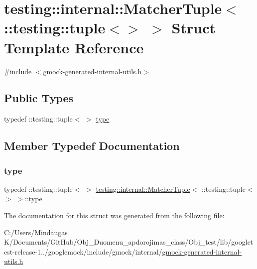 \hypertarget{structtesting_1_1internal_1_1_matcher_tuple_3_01_1_1testing_1_1tuple_3_4_01_4}{}\section{testing\+::internal\+::Matcher\+Tuple$<$ \+::testing\+::tuple$<$$>$ $>$ Struct Template Reference}
\label{structtesting_1_1internal_1_1_matcher_tuple_3_01_1_1testing_1_1tuple_3_4_01_4}


{\ttfamily \#include $<$gmock-\/generated-\/internal-\/utils.\+h$>$}

\subsection*{Public Types}
\begin{DoxyCompactItemize}
\item 
typedef \+::testing\+::tuple$<$ $>$ \mbox{\hyperlink{structtesting_1_1internal_1_1_matcher_tuple_3_01_1_1testing_1_1tuple_3_4_01_4_a8d4493b2b299322e6c885dee5473ebd7}{type}}
\end{DoxyCompactItemize}


\subsection{Member Typedef Documentation}
\mbox{\label{structtesting_1_1internal_1_1_matcher_tuple_3_01_1_1testing_1_1tuple_3_4_01_4_a8d4493b2b299322e6c885dee5473ebd7}} 
\subsubsection{\texorpdfstring{type}{type}}
{\footnotesize\ttfamily typedef \+::testing\+::tuple$<$ $>$ \mbox{\hyperlink{structtesting_1_1internal_1_1_matcher_tuple}{testing\+::internal\+::\+Matcher\+Tuple}}$<$ \+::testing\+::tuple$<$$>$ $>$\+::\mbox{\hyperlink{structtesting_1_1internal_1_1_matcher_tuple_3_01_1_1testing_1_1tuple_3_4_01_4_a8d4493b2b299322e6c885dee5473ebd7}{type}}}



The documentation for this struct was generated from the following file\+:\begin{DoxyCompactItemize}
\item 
C\+:/\+Users/\+Mindaugas K/\+Documents/\+Git\+Hub/\+Obj\+\_\+\+Duomenu\+\_\+apdorojimas\+\_\+class/\+Obj\+\_\+test/lib/googletest-\/release-\/1../googlemock/include/gmock/internal/\mbox{\hyperlink{gmock-generated-internal-utils_8h}{gmock-\/generated-\/internal-\/utils.\+h}}\end{DoxyCompactItemize}
